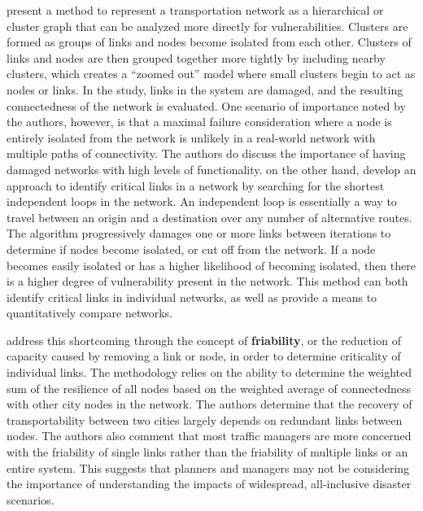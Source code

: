 \citet{agarwal2011} present a method to represent a transportation network
as a
hierarchical or cluster graph that can be analyzed more directly for
vulnerabilities. Clusters are formed as groups of links and nodes become
isolated from each other. Clusters of links and nodes are then grouped
together more tightly by including nearby clusters, which creates a
``zoomed out'' model where small clusters begin to act as nodes or links.
In the study, links in the system are damaged, and the resulting
connectedness of the network is evaluated. One scenario of importance
noted by the authors, however, is that a maximal failure consideration where a
node
is entirely isolated from the network is unlikely in a real-world network
with
multiple paths of connectivity. The authors do discuss the importance of
having damaged networks with high levels of functionality. \citet{vodak2019}
on the other hand, develop an approach to identify
critical links in a network by searching for the shortest independent
loops in the network. An independent loop is essentially a way to travel
between an origin and a destination over any number of alternative routes.
The algorithm progressively damages one or more links
between iterations to determine if nodes become isolated, or cut off from
the
network. If a node becomes easily isolated or has a higher likelihood of
becoming isolated, then there is a higher degree of vulnerability present
in the
network. This method can both identify critical links in individual
networks, as
well as provide a means to quantitatively compare networks.

\citet{ip2011} address this shortcoming through the concept of
\textbf{friability}, or
the reduction of capacity caused by removing a link or node, in order to
determine criticality of individual links. The methodology relies on the
ability
to determine the weighted sum of the resilience of all nodes based on the
weighted average of connectedness with other city nodes in the network. The
authors determine that the recovery of transportability between two cities
largely depends on redundant links between nodes. The authors also comment
that
most traffic managers are more concerned with the friability of single
links
rather than the friability of multiple links or an entire system. This suggests
that planners and managers may not be considering the importance of
understanding the impacts of widespread, all-inclusive disaster scenarios.

